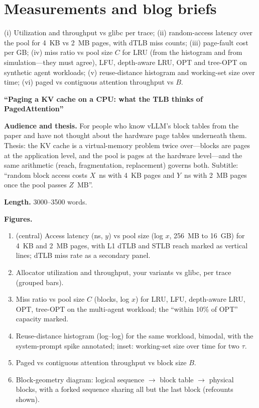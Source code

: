 \section{Measurements and blog briefs}

(i) Utilization and throughput vs glibc per trace; (ii) random-access latency over the pool for 4~KB vs 2~MB pages, with dTLB miss counts; (iii) page-fault cost per GB; (iv) miss ratio vs pool size $C$ for LRU (from the histogram and from simulation---they must agree), LFU, depth-aware LRU, OPT and tree-OPT on synthetic agent workloads; (v) reuse-distance histogram and working-set size over time; (vi) paged vs contiguous attention throughput vs $B$.

\begin{blogbox}
 \textbf{``Paging a KV cache on a CPU: what the TLB thinks of PagedAttention''}

\textbf{Audience and thesis.} For people who know vLLM's block tables from the paper and have not thought about the hardware page tables underneath them. Thesis: the KV cache is a virtual-memory problem twice over---blocks are pages at the application level, and the pool is pages at the hardware level---and the same arithmetic (reach, fragmentation, replacement) governs both. Subtitle: ``random block access costs $X$~ns with 4~KB pages and $Y$~ns with 2~MB pages once the pool passes $Z$~MB''.

\textbf{Length.} 3000--3500 words.

\textbf{Figures.}
\begin{enumerate}
  \item {} (central) Access latency (ns, $y$) vs pool size (log $x$, 256~MB to 16~GB) for 4~KB and 2~MB pages, with L1 dTLB and STLB reach marked as vertical lines; dTLB miss rate as a secondary panel.
  \item {} Allocator utilization and throughput, your variants vs glibc, per trace (grouped bars).
  \item {} Miss ratio vs pool size $C$ (blocks, log $x$) for LRU, LFU, depth-aware LRU, OPT, tree-OPT on the multi-agent workload; the ``within 10\% of OPT'' capacity marked.
  \item {} Reuse-distance histogram (log--log) for the same workload, bimodal, with the system-prompt spike annotated; inset: working-set size over time for two $\tau$.
  \item {} Paged vs contiguous attention throughput vs block size $B$.
  \item {} Block-geometry diagram: logical sequence $\to$ block table $\to$ physical blocks, with a forked sequence sharing all but the last block (refcounts shown).
\end{enumerate}


\end{blogbox}
